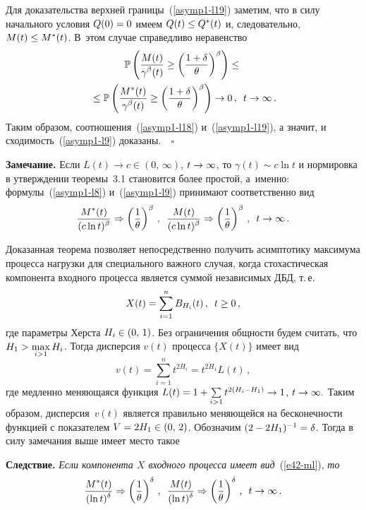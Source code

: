 \begin{multicols}{2}
Для доказательства верхней границы~(\ref{asymp1-l19}) заметим,
что в силу начального условия $Q(0)\hm=0$ имеем $Q(t)\hm \leq Q^*(t)$
и, следовательно, $M(t)\hm \leq M^*(t)$. В~этом случае справедливо неравенство
\begin{multline*}
\mathbb{P}\left( \displaystyle\frac{\displaystyle M(t)\mathstrut}{\displaystyle \gamma^\beta(t)\mathstrut}\geq
\left(\displaystyle\frac{\displaystyle 1+\delta\mathstrut}{\displaystyle \theta\mathstrut}\right)^\beta\right) \leq{}\\
{}\leq \mathbb{P}\left(
\displaystyle\frac{\displaystyle M^*(t)\mathstrut}{\displaystyle \gamma^\beta(t)\mathstrut}\geq
\left(\displaystyle\frac{\displaystyle 1+\delta\mathstrut}{\displaystyle \theta\mathstrut}\right)^\beta\right) \to 0\,,\enskip  t\to \infty\,.
\end{multline*}
Таким образом, соотношения~(\ref{asymp1-l18}) и~(\ref{asymp1-l19}),
а значит, и сходимость~(\ref{asymp1-l9})  доказаны.~\hfill~$\square$

\medskip


\noindent
\textbf{Замечание.}
Если $L(t) \to c\in (0,\,\infty)$, $t \hm\to \infty$,  то
$\gamma(t)\sim c \ln t$ и нормировка в утверждении теоремы~3.1
становится более простой, а~именно: формулы~(\ref{asymp1-l8})
и~(\ref{asymp1-l9}) принимают соответственно вид
$$
\displaystyle\frac{\displaystyle M^*(t)\mathstrut}{\displaystyle (c\ln t)^\beta\mathstrut} \Rightarrow
\left(\displaystyle\frac{\displaystyle 1\mathstrut}{\displaystyle \theta\mathstrut}\right)^\beta\,,\enskip \displaystyle\frac{\displaystyle M(t)\mathstrut}{\displaystyle (c\ln
t)^\beta\mathstrut} \Rightarrow
\left(\displaystyle\frac{\displaystyle 1\mathstrut}{\displaystyle \theta\mathstrut}\right)^\beta\,,\enskip t \to \infty\,.
$$

\smallskip

Доказанная теорема позволяет непосредственно  получить асимптотику
максимума процесса нагрузки для специального важного случая, когда
стохастическая компонента входного процесса является суммой
независимых ДБД, т.\,е.\
\begin{equation}
X(t)=\sum\limits_{i=1}^n B_{H_i}(t)\,,\enskip t\ge 0\,,
\label{e42-ml}
\end{equation}
где параметры Херста $H_i\hm\in (0,\,1)$.
 Без ограничения общности будем считать, что
$H_1\hm>\max\limits_{i>1}H_i$. Тогда  дисперсия $v(t)$  процесса $\{X(t)\}$  имеет вид
$$
v(t)=\sum\limits_{i=1}^n t^{2H_i}=t^{2H_1}L(t)\,,
$$
где медленно меняющаяся функция $ L(t)\hm=1\hm+\sum\limits_{i>1}
t^{2(H_i-H_1)}\hm\to 1$, $t \hm\to \infty. $ Таким образом,  дисперсия~$v(t)$ 
является правильно меняющейся на бесконечности функцией с
показателем $V\hm=2H_1\hm\in (0,\,2)$. Обозначим $ (2-2H_1)^{-1}\hm=\delta$.
Тогда в силу замечания выше имеет место такое

\smallskip

\noindent
\textbf{Следствие.}
\textit{Если компонента $X$  входного процесса имеет вид}~(\ref{e42-ml}), \textit{то}
$$
\displaystyle\frac{\displaystyle M^*(t)\mathstrut}{\displaystyle (\ln t)^\delta\mathstrut} \Rightarrow
\left(\displaystyle\frac{\displaystyle 1\mathstrut}{\displaystyle \theta\mathstrut}\right)^{\delta}\,,\enskip \displaystyle\frac{\displaystyle M(t)\mathstrut}{\displaystyle (\ln
t)^\delta\mathstrut} \Rightarrow
\left(\displaystyle\frac{\displaystyle 1\mathstrut}{\displaystyle \theta\mathstrut}\right)^\delta\,,\enskip t \to \infty\,.
$$


\end{multicols}
